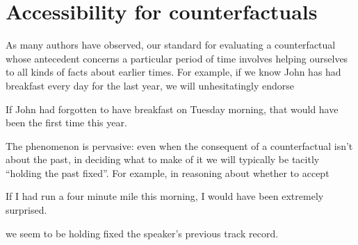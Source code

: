 \documentclass[If.tex]{subfiles}
\begin{document}





\section{Accessibility for counterfactuals}\label{sect:cf}
As many authors have observed, our standard for evaluating a counterfactual whose antecedent concerns a particular period of time involves helping ourselves to all kinds of facts about earlier times. For example, if we know John has had breakfast every day for the last year, we will unhesitatingly endorse
\begin{prop}
	\nitem \label{breakfast}
		If John had forgotten to have breakfast on Tuesday morning, that would have been the first time this year.
\end{prop}
The phenomenon is pervasive: even when the consequent of a counterfactual isn't about the past, in deciding what to make of it we will typically be tacitly “holding the past fixed”. For example, in reasoning about whether to accept
\begin{prop}
	\nitem 
	If I had run a four minute mile this morning, I would have been extremely surprised.
\end{prop}
we seem to be holding fixed the speaker's previous track record.
\end{document}
